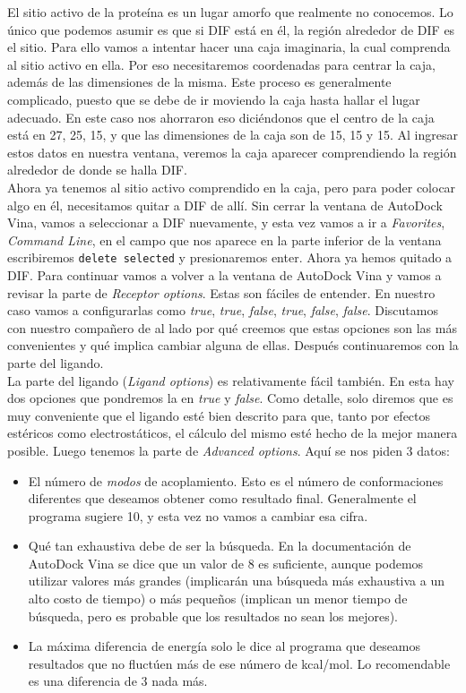 \documentclass[10pt,letterpaper]{article}
\newcommand{\inlinecode}[1]{
\colorbox{light-gray}{\texttt{#1}}
}
\begin{document}
El sitio activo de la prote\'ina es un lugar amorfo que realmente no conocemos. Lo \'unico que podemos asumir es que si DIF est\'a en \'el, la regi\'on alrededor de DIF es el sitio. Para ello vamos a intentar hacer una caja imaginaria, la cual comprenda al sitio activo en ella. Por eso necesitaremos coordenadas para centrar la caja, adem\'as de las dimensiones de la misma. Este proceso es generalmente complicado, puesto que se debe de ir moviendo la caja hasta hallar el lugar adecuado. En este caso nos ahorraron eso dici\'endonos que el centro de la caja est\'a en 27, 25, 15, y que las dimensiones de la caja son de 15, 15 y 15. Al ingresar estos datos en nuestra ventana, veremos la caja aparecer comprendiendo la regi\'on alrededor de donde se halla DIF.\\

Ahora ya tenemos al sitio activo comprendido en la caja, pero para poder colocar algo en \'el, necesitamos quitar a DIF de all\'i. Sin cerrar la ventana de AutoDock Vina, vamos a seleccionar a DIF nuevamente, y esta vez vamos a ir a \emph{Favorites}, \emph{Command Line}, en el campo que nos aparece en la parte inferior de la ventana escribiremos \inlinecode{delete selected} y presionaremos enter. Ahora ya hemos quitado a DIF. Para continuar vamos a volver a la ventana de AutoDock Vina y vamos a revisar la parte de \emph{Receptor options}. Estas son f\'aciles de entender. En nuestro caso vamos a configurarlas como \emph{true}, \emph{true}, \emph{false}, \emph{true}, \emph{false}, \emph{false}. Discutamos con nuestro compa\~nero de al lado por qu\'e creemos que estas opciones son las m\'as convenientes y qu\'e implica cambiar alguna de ellas. Despu\'es continuaremos con la parte del ligando.\\

La parte del ligando (\emph{Ligand options}) es relativamente f\'acil tambi\'en. En esta hay dos opciones que pondremos la en \emph{true} y \emph{false}. Como detalle, solo diremos que es muy conveniente que el ligando est\'e bien descrito para que, tanto por efectos est\'ericos como electrost\'aticos, el c\'alculo del mismo est\'e hecho de la mejor manera posible. Luego tenemos la parte de \emph{Advanced options}. Aqu\'i se nos piden 3 datos:

\begin{itemize}
\item El n\'umero de \textit{modos} de acoplamiento. Esto es el n\'umero de conformaciones diferentes que deseamos obtener como resultado final. Generalmente el programa sugiere 10, y esta vez no vamos a cambiar esa cifra.
\item Qu\'e tan exhaustiva debe de ser la b\'usqueda. En la documentaci\'on de AutoDock Vina se dice que un valor de 8 es suficiente, aunque podemos utilizar valores m\'as grandes (implicar\'an una b\'usqueda m\'as exhaustiva a un alto costo de tiempo) o m\'as peque\~nos (implican un menor tiempo de b\'usqueda, pero es probable que los resultados no sean los mejores).
\item La m\'axima diferencia de energ\'ia solo le dice al programa que deseamos resultados que no fluct\'uen m\'as de ese n\'umero de kcal/mol. Lo recomendable es una diferencia de 3 nada m\'as.
\end{itemize}
\end{document}
